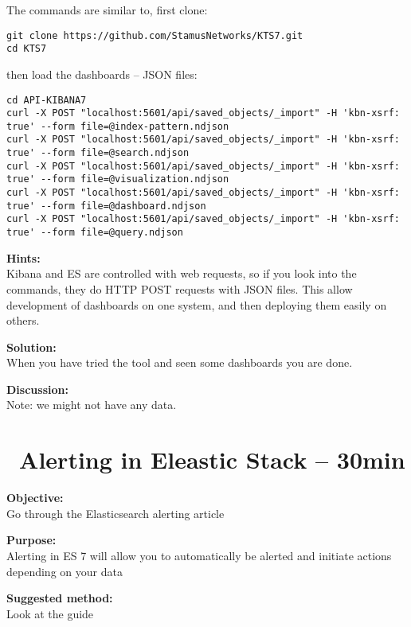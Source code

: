 \documentclass[a4paper,11pt,notitlepage]{report}
\begin{document}
The commands are similar to, first clone:
\begin{verbatim}
git clone https://github.com/StamusNetworks/KTS7.git
cd KTS7
\end{verbatim}

\eject
then load the dashboards -- JSON files:
\begin{verbatim}
cd API-KIBANA7
curl -X POST "localhost:5601/api/saved_objects/_import" -H 'kbn-xsrf: true' --form file=@index-pattern.ndjson
curl -X POST "localhost:5601/api/saved_objects/_import" -H 'kbn-xsrf: true' --form file=@search.ndjson
curl -X POST "localhost:5601/api/saved_objects/_import" -H 'kbn-xsrf: true' --form file=@visualization.ndjson
curl -X POST "localhost:5601/api/saved_objects/_import" -H 'kbn-xsrf: true' --form file=@dashboard.ndjson
curl -X POST "localhost:5601/api/saved_objects/_import" -H 'kbn-xsrf: true' --form file=@query.ndjson
\end{verbatim}



{\bf Hints:}\\
Kibana and ES are controlled with web requests, so if you look into the commands, they do HTTP POST requests with JSON files. This allow development of dashboards on one system, and then deploying them easily on others.

{\bf Solution:}\\
When you have tried the tool and seen some dashboards you are done.



{\bf Discussion:}\\
Note: we might not have any data.



\chapter{\faInfoCircle\ Alerting in Eleastic Stack -- 30min}
\label{ex:es7-alerting}


{\bf Objective:}\\
Go through the Elasticsearch alerting article

{\bf Purpose:}\\
Alerting in ES 7 will allow you to automatically be alerted and initiate actions depending on your data


{\bf Suggested method:}\\
Look at the guide
\end{document}
